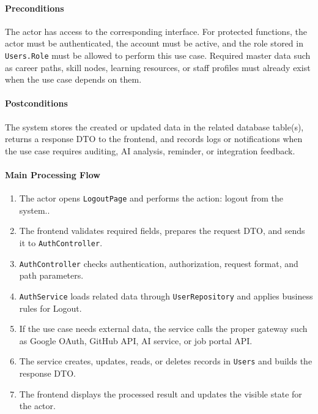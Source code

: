 \paragraph{Preconditions}

The actor has access to the corresponding interface. For protected functions, the actor must be authenticated, the account must be active, and the role stored in \texttt{Users.Role} must be allowed to perform this use case. Required master data such as career paths, skill nodes, learning resources, or staff profiles must already exist when the use case depends on them.

\paragraph{Postconditions}

The system stores the created or updated data in the related database table(s), returns a response DTO to the frontend, and records logs or notifications when the use case requires auditing, AI analysis, reminder, or integration feedback.

\paragraph{Main Processing Flow}

\begin{enumerate}
    \item The actor opens \texttt{LogoutPage} and performs the action: logout from the system..
    \item The frontend validates required fields, prepares the request DTO, and sends it to \texttt{AuthController}.
    \item \texttt{AuthController} checks authentication, authorization, request format, and path parameters.
    \item \texttt{AuthService} loads related data through \texttt{UserRepository} and applies business rules for Logout.
    \item If the use case needs external data, the service calls the proper gateway such as Google OAuth, GitHub API, AI service, or job portal API.
    \item The service creates, updates, reads, or deletes records in \texttt{Users} and builds the response DTO.
    \item The frontend displays the processed result and updates the visible state for the actor.
\end{enumerate}

